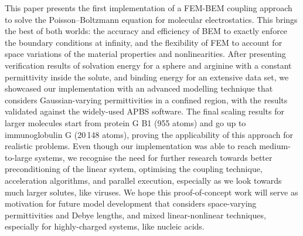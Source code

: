 This paper presents the first implementation of a FEM-BEM coupling approach to solve the Poisson--Boltzmann equation for molecular electrostatics. This brings the best of both worlds: the accuracy and efficiency of BEM to exactly enforce the boundary conditions at infinity, and the flexibility of FEM to account for space variations of the material properties and nonlinearities. After presenting verification results of solvation energy for a sphere and arginine with a constant permittivity inside the solute, and binding energy for an extensive data set, we showcased our implementation with an advanced modelling technique that considers Gaussian-varying permittivities in a confined region, with the results validated against the widely-used APBS software. The final scaling results for larger molecules start from protein G B1 (955 atoms) and go up to immunoglobulin G (20\,148 atoms), proving the applicability of this approach for realistic problems. Even though our implementation was able to reach medium-to-large systems, we recognise the need for further research towards better preconditioning of the linear system, optimising the coupling technique, acceleration algorithms, and parallel execution, especially as we look towards much larger solutes, like viruses. We hope this proof-of-concept work will serve as motivation for future model development that considers space-varying permittivities and Debye lengths, and mixed linear-nonlinear techniques, especially for highly-charged systems, like nucleic acids. 
